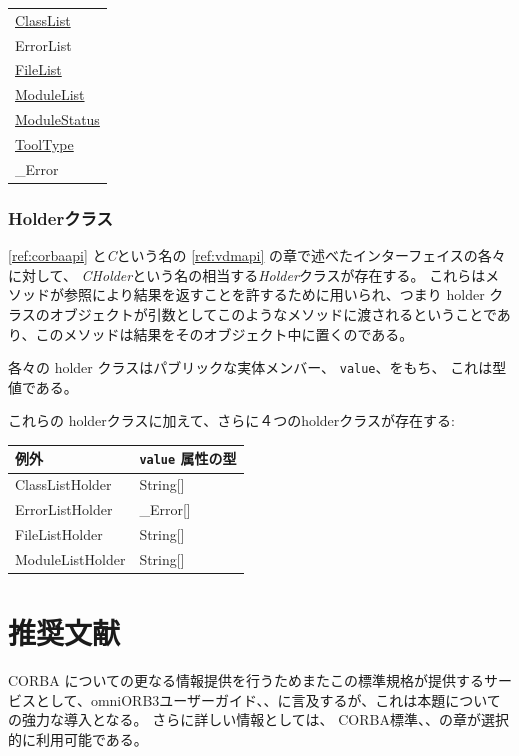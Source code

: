 \documentclass[\pformat,12pt]{jarticle}
\newcommand{\ModuleList}{\hyperlink{type.ModuleList}{ModuleList}}
\newcommand{\ClassList}{\hyperlink{type.ClassList}{ClassList}}
\newcommand{\FileList}{\hyperlink{type.FileList}{FileList}}
\newcommand{\ToolType}{\hyperlink{type.ToolType}{ToolType}}
\newcommand{\ModuleStatus}{\hyperlink{struct.ModuleStatus}{ModuleStatus}}
\begin{document}
\begin{tabular}{>{\ttfamily}l}
\ClassList \\
ErrorList \\
\FileList \\
\ModuleList \\
\ModuleStatus \\
\ToolType \\
\_Error \\
\end{tabular}




\subsubsection{Holderクラス}\label{ref:holder}
\ref{ref:corbaapi} と\textit{C}という名の
 \ref{ref:vdmapi} の章で述べたインターフェイスの各々に対して、
\textit{CHolder}という名の相当する\textit{Holder}クラスが存在する。
これらはメソッドが参照により結果を返すことを許するために用いられ、つまり holder クラスのオブジェクトが引数としてこのようなメソッドに渡されるということであり、このメソッドは結果をそのオブジェクト中に置くのである。

各々の holder クラスはパブリックな実体メンバー、 \texttt{value}、をもち、
これは型値である。

これらの holderクラスに加えて、さらに４つのholderクラスが存在する: 

\begin{tabular}{|>{\ttfamily}p{5.5cm}|>{\ttfamily}p{5.5cm}|}
  \hline
\textrm{\bfseries 例外} & \textrm{\bfseries \texttt{value} 属性の型}
  \\ \hline
ClassListHolder  &  String[] \\ \hline
ErrorListHolder  &  \_Error[] \\ \hline
FileListHolder   & String[] \\ \hline
ModuleListHolder & String[] \\ \hline
\end{tabular}


\newpage
\section{推奨文献}
 CORBA についての更なる情報提供を行うためまたこの標準規格が提供するサービスとして、omniORB3ユーザーガイド、\cite{omniORB3}、に言及するが、これは本題についての強力な導入となる。
さらに詳しい情報としては、  CORBA標準、\cite{OMG&96}、の章が選択的に利用可能である。



\end{document}

